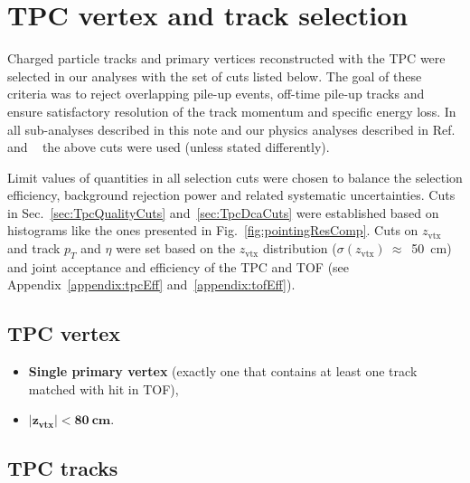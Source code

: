 

\chapter{TPC vertex and track selection}\label{chap:TpcTrackQualityCuts}

Charged particle tracks and primary vertices reconstructed with the TPC were selected in our analyses with the set of cuts listed below. The goal of these criteria was to reject overlapping pile-up events, off-time pile-up tracks and ensure satisfactory resolution of the track momentum and specific energy loss. In all sub-analyses described in this note and our physics analyses described in Ref.~\cite{AnalysisNoteRafal} and ~\cite{AnalysisNoteLukasz} the above cuts were used (unless stated differently).

Limit values of quantities in all selection cuts were chosen to balance the selection efficiency, background rejection power and related systematic uncertainties. Cuts in Sec.~\ref{sec:TpcQualityCuts} and~\ref{sec:TpcDcaCuts} were established based on histograms like the ones presented in Fig.~\ref{fig:pointingResComp}. Cuts on $z_{\text{vtx}}$ and track $p_{T}$ and $\eta$ were set based on the $z_{\text{vtx}}$ distribution ($\sigma(z_{\text{vtx}})~\approx$~50~cm) and joint acceptance and efficiency of the TPC and TOF (see Appendix~\ref{appendix:tpcEff} and~\ref{appendix:tofEff}).

\section{TPC vertex}
\begin{itemize}
\item \textbf{Single primary vertex} (exactly one that contains at least one track matched with hit in TOF),
\item \textbf{$\bm{|z_{\text{vtx}}|<80~\text{cm}}$}.
\end{itemize}

\section{TPC tracks}
